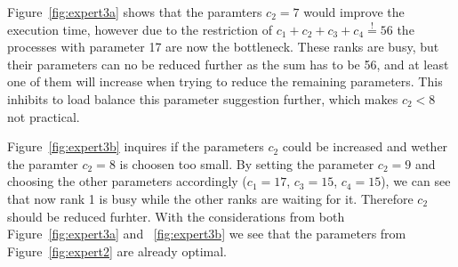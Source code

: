 \documentclass[article]{scrartcl}
\begin{document}
Figure~\ref{fig:expert3a} shows that the paramters $c_2=7$ would improve the execution time, however due to the restriction of $c_1+c_2+c_3+c_4 \overset{!}{=} 56 $ the processes with parameter 17 are now the bottleneck. 
These ranks are busy, but their parameters can no be reduced further as the sum has to be 56, and at least one of them will increase when trying to reduce the remaining parameters. This inhibits to load balance this parameter suggestion further, which makes $c_2<8$ not practical.

Figure~\ref{fig:expert3b} inquires if the parameters $c_2$ could be increased and wether the paramter $c_2=8$ is choosen too small. By setting the parameter $c_2=9$ and choosing the other parameters accordingly ($c_1=17$, $c_3=15$, $c_4=15$), we can see that now rank 1 is busy while the other ranks are waiting for it. Therefore $c_2$ should be reduced furhter.
With the considerations from both Figure~\ref{fig:expert3a} and ~\ref{fig:expert3b} we see that the parameters from Figure~\ref{fig:expert2} are already optimal.


\medskip
{}

\end{document}
